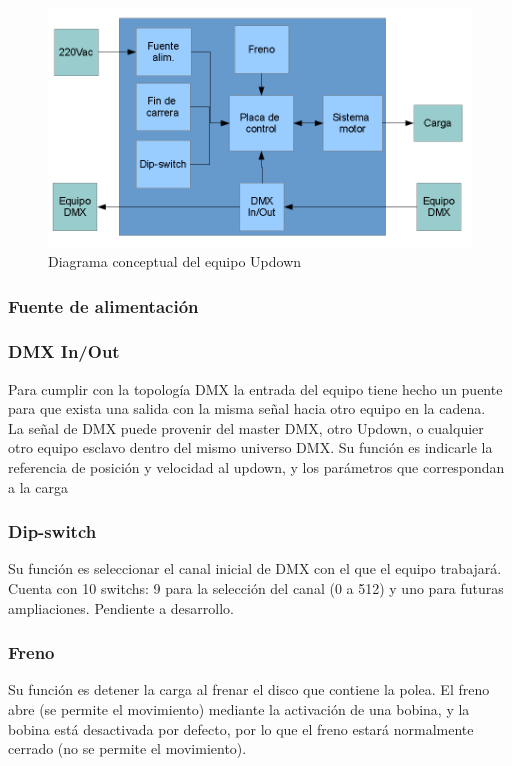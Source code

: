 \begin{figure}[!ht]
	\centering
	\includegraphics[width=15cm,scale=1]{resources/1_10-diagramaBasicoUpdown.png}
	\caption{Diagrama conceptual del equipo Updown}
	\label{fig:\thefigure}
\end{figure}

\subsubsection{Fuente de alimentación}

\subsubsection{DMX In/Out}
Para cumplir con la topología DMX la entrada del equipo tiene hecho un puente para que exista una salida con la misma señal hacia otro equipo en la cadena.\\
La señal de DMX puede provenir del master DMX, otro Updown, o cualquier otro equipo esclavo dentro del mismo universo DMX. Su función es indicarle la referencia de posición y velocidad al updown, y los parámetros que correspondan a la carga

\subsubsection{Dip-switch}
Su función es seleccionar el canal inicial de DMX con el que el equipo trabajará. Cuenta con 10 switchs: 9 para la selección del canal (0 a 512) y uno para futuras ampliaciones. Pendiente a desarrollo.

\subsubsection{Freno}
Su función es detener la carga al frenar el disco que contiene la polea. El freno abre (se permite el movimiento) mediante la activación de una bobina, y la bobina está desactivada por defecto, por lo que el freno estará normalmente cerrado (no se permite el movimiento).

